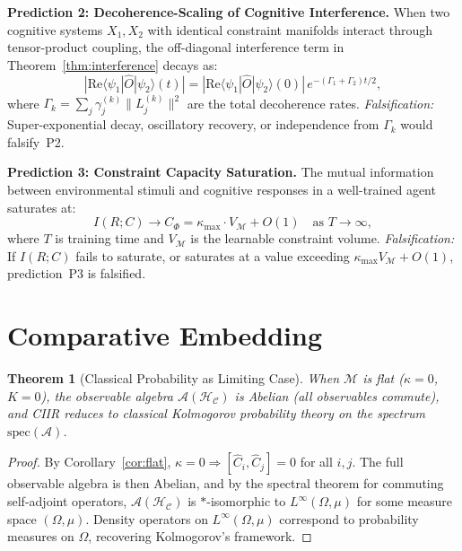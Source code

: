 \documentclass[twocolumn,aps,prd,superscriptaddress,nofootinbib]{revtex4-2}
\newtheorem{theorem}{Theorem}[section]
\newcommand{\HC}{\mathcal{H}_{\mathcal{C}}}
\newcommand{\CM}{\mathcal{M}}
\newcommand{\CA}{\mathcal{A}}
\newcommand{\hatC}{\hat{C}}
\newcommand{\hatO}{\hat{O}}
\begin{document}
\textbf{Prediction 2: Decoherence-Scaling of Cognitive Interference.}
When two cognitive systems $X_1,X_2$ with identical constraint manifolds
interact through tensor-product coupling, the off-diagonal interference term
in Theorem~\ref{thm:interference} decays as:
\begin{equation}
  |\mathrm{Re}\langle\psi_1|\hatO|\psi_2\rangle(t)| =
    |\mathrm{Re}\langle\psi_1|\hatO|\psi_2\rangle(0)|\,
    e^{-(\Gamma_1+\Gamma_2)t/2},
  \label{eq:pred2}
  \tag{P2}
\end{equation}
where $\Gamma_k = \sum_j \gamma_{j}^{(k)} \|L_j^{(k)}\|^2$ are the total
decoherence rates.  \emph{Falsification:} Super-exponential decay, oscillatory
recovery, or independence from $\Gamma_k$ would falsify~P2.

\textbf{Prediction 3: Constraint Capacity Saturation.}
The mutual information between environmental stimuli and cognitive responses in
a well-trained agent saturates at:
\begin{equation}
  I(R;C) \to C_\Phi = \kappa_\mathrm{max}\cdot V_\CM + O(1)
    \quad \text{as } T \to \infty,
  \label{eq:pred3}
  \tag{P3}
\end{equation}
where $T$ is training time and $V_\CM$ is the learnable constraint volume.
\emph{Falsification:} If $I(R;C)$ fails to saturate, or saturates at a
value exceeding $\kappa_\mathrm{max}V_\CM + O(1)$, prediction~P3 is falsified.

\section{Comparative Embedding}
\label{sec:embedding}

\begin{theorem}[Classical Probability as Limiting Case]
\label{thm:classicallimit}
When $\CM$ is flat ($\kappa = 0$, $K=0$), the observable algebra
$\CA(\HC)$ is Abelian (all observables commute), and CIIR reduces to
classical Kolmogorov probability theory on the spectrum
$\mathrm{spec}(\CA)$.
\end{theorem}

\begin{proof}
By Corollary~\ref{cor:flat}, $\kappa = 0 \Rightarrow [\hatC_i,\hatC_j]=0$ for all $i,j$.  The full observable algebra is then Abelian, and by the spectral theorem for commuting self-adjoint operators, $\CA(\HC)$ is $*$-isomorphic to $L^\infty(\Omega, \mu)$ for some measure space $(\Omega,\mu)$.  Density operators on $L^\infty(\Omega,\mu)$ correspond to probability measures on $\Omega$, recovering Kolmogorov's framework.
\end{proof}
\end{document}
